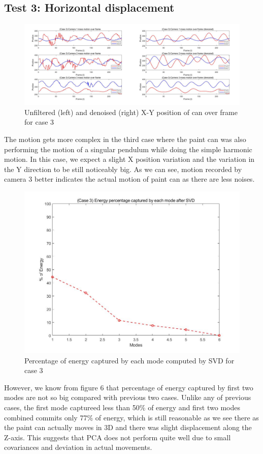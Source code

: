 \documentclass[11pt,a4paper]{article}
\numberwithin{equation}{subsection}
\begin{document}
\subsection{Test 3: Horizontal displacement}
\begin{figure}[H]
\begin{center}
\includegraphics[scale=0.20]{f5.jpg}
\caption{Unfiltered (left) and denoised (right) X-Y position of can over frame for case 3}
\end{center}
\end{figure}
The motion gets more complex in the third case where the paint can was also performing the motion of a singular pendulum while doing the simple harmonic motion. In this case, we expect a slight X position variation and the variation in the Y direction to be still noticeably big. As we can see, motion recorded by camera 3 better indicates the actual motion of paint can as there are less noises.
\begin{figure}[H]
\begin{center}
\includegraphics[scale=0.20]{f6.jpg}
\caption{Percentage of energy captured by each mode computed by SVD for case 3}
\end{center}
\end{figure}
However, we know from figure 6 that percentage of energy captured by first two modes are not so big compared with previous two cases. Unlike any of previous cases, the first mode captureed less than 50\% of energy and first two modes combined commits only 77\% of energy, which is still reasonable as we see there as the paint can actually moves in 3D and there was slight displacement along the Z-axis. This suggests that PCA does not perform quite well due to small covariances and deviation in actual movements.
\end{document}
